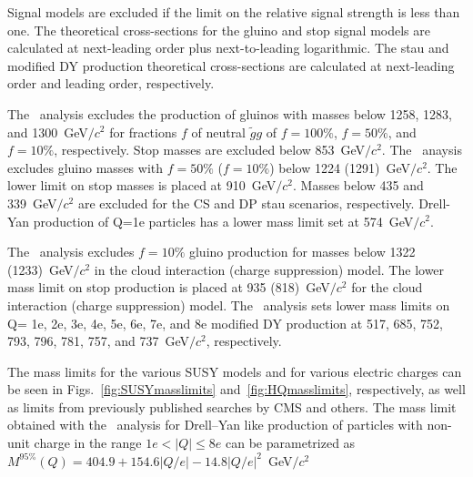 Signal models are excluded if the limit on the relative signal strength is less than one.
The theoretical cross-sections for the gluino and stop signal models are calculated at next-leading order plus next-to-leading logarithmic.
The stau and modified DY production theoretical cross-sections are calculated at next-leading order and leading order, respectively.

The \muononly\ analysis excludes the production of gluinos with masses below 1258, 1283, and 1300~GeV$/c^2$ for fractions $f$ of neutral $\tilde{g}g$ of
$f=100\%$, $f=50\%$, and $f=10\%$, respectively. Stop masses are excluded below 853~GeV$/c^2$. The \tktof\ anaysis excludes gluino masses with
$f=50\%$ ($f=10\%$) below 1224 (1291)~GeV$/c^2$. The lower limit on stop masses is placed at 910~GeV$/c^2$. Masses below 435 and 339~GeV$/c^2$ are excluded for the CS 
and DP stau scenarios, respectively. Drell-Yan production of Q=1e particles has a lower mass limit set at 574~GeV$/c^2$. 

The \tkonly\ analysis excludes $f=10\%$ gluino production for masses below 1322 (1233)~GeV$/c^2$ in the cloud interaction (charge suppression) model. 
The lower mass limit on stop production is placed at 935 (818)~GeV$/c^2$ for the cloud interaction (charge suppression) model.
The \multi\ analysis sets lower mass limits on Q= 1e, 2e, 3e, 4e, 5e, 6e, 7e, and 8e modified DY production at 517, 685, 752, 793, 796, 781, 757, and 737~GeV$/c^2$, respectively.

The mass limits for the various SUSY models and for various electric charges can be seen in Figs.~\ref{fig:SUSYmasslimits}
and~\ref{fig:HQmasslimits}, respectively, as well as limits from previously published searches by CMS and others.
The mass limit obtained with the \multi\ analysis for Drell--Yan like production of
particles  with non-unit charge in the range $1e<|Q|\leq8e$ can be parametrized
as $M^{95\%}(Q) = 404.9 + 154.6 |Q/e| - 14.8 |Q/e|^2$~GeV$/c^2$

